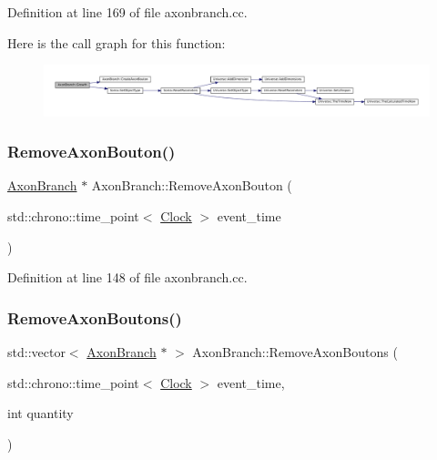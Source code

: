 Definition at line 169 of file axonbranch.\+cc.

Here is the call graph for this function\+:\nopagebreak
\begin{figure}[H]
\begin{center}
\leavevmode
\includegraphics[width=350pt]{class_axon_branch_a6e434a57873ab0fdbc72cf7ecc7228ed_cgraph}
\end{center}
\end{figure}
\mbox{\label{class_axon_branch_a06753a2a61941a59d86510e51ba44b15}} 
\subsubsection{\texorpdfstring{Remove\+Axon\+Bouton()}{RemoveAxonBouton()}}
{\footnotesize\ttfamily \mbox{\hyperlink{class_axon_branch}{Axon\+Branch}} $\ast$ Axon\+Branch\+::\+Remove\+Axon\+Bouton (\begin{DoxyParamCaption}\item[{std\+::chrono\+::time\+\_\+point$<$ \mbox{\hyperlink{universe_8h_a0ef8d951d1ca5ab3cfaf7ab4c7a6fd80}{Clock}} $>$}]{event\+\_\+time }\end{DoxyParamCaption})}



Definition at line 148 of file axonbranch.\+cc.

\mbox{\label{class_axon_branch_a815e055e37f89fb2627b250c5b95d406}} 
\subsubsection{\texorpdfstring{Remove\+Axon\+Boutons()}{RemoveAxonBoutons()}}
{\footnotesize\ttfamily std\+::vector$<$ \mbox{\hyperlink{class_axon_branch}{Axon\+Branch}} $\ast$ $>$ Axon\+Branch\+::\+Remove\+Axon\+Boutons (\begin{DoxyParamCaption}\item[{std\+::chrono\+::time\+\_\+point$<$ \mbox{\hyperlink{universe_8h_a0ef8d951d1ca5ab3cfaf7ab4c7a6fd80}{Clock}} $>$}]{event\+\_\+time,  }\item[{int}]{quantity }\end{DoxyParamCaption})}



